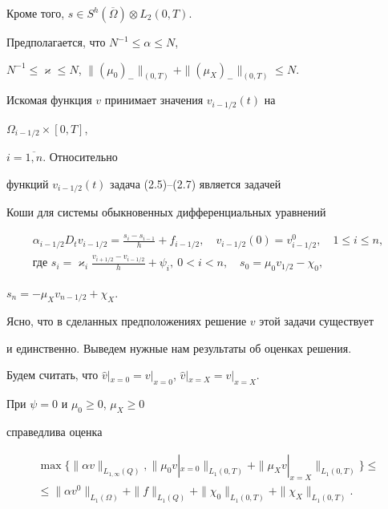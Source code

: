 \documentclass[12pt]{article}
\theoremstyle{plain} %
\newtheorem{lemm}{\hskip\parindent Лемма}[section]
\theoremstyle{definition}
\numberwithin{equation}{section}
\begin{document}
Кроме того, $s\in S^h(\overline\Omega)\otimes L_2(0,T)$.


Предполагается, что $N^{-1}\le \alpha\le N$,


$N^{-1}\le \varkappa\le N$, $\|(\mu_0)_-\|_{(0,T)}+\|(\mu_X)_-\|_{(0,T)}\le N$.





Искомая функция $v$ принимает значения $v_{i-1/2}(t)$ на


$\Omega_{i-1/2}\times [0,T]$,


$i=\overline{1,n}$. Относительно


функций $v_{i-1/2}(t)$ задача (2.5)--(2.7) является задачей


Коши для системы обыкновенных дифференциальных уравнений


\begin{gather*}


\alpha_{i-1/2}D_tv_{i-1/2}=\frac{s_i-s_{i-1}}{h}+f_{i-1/2},


\quad v_{i-1/2}(0)=v^0_{i-1/2},\quad 1\le i\le n,\\


%


\text{где }s_i=\varkappa_i\frac{v_{i+1/2}-v_{i-1/2}}{h}+\psi_i,\


0<i<n,\quad s_0=\mu_0 v_{1/2}-\chi_0,


\end{gather*}


$s_n=-\mu_X v_{n-1/2}+\chi_X$.


Ясно, что в сделанных предположениях решение $v$ этой задачи существует


и единственно. Выведем нужные нам результаты об оценках решения.


Будем считать, что $\widehat v|_{x=0}=v|_{x=0}$, $\widehat v|_{x=X}=v|_{x=X}$.





\begin{lemm} При $\psi=0$ и $\mu_0\ge 0$, $\mu_X\ge 0$


справедлива оценка


\begin{multline*}


\max\bigl\{\|\alpha v\|_{L_{1,\infty}(Q)},\|\mu_0 v|_{x=0}\|_{L_1(0,T)}+


\|\mu_X v|_{x=X}\|_{L_1(0,T)}\bigr\}\le \\


%


\le \|\alpha v^0\|_{L_1(\Omega)}+


\|f\|_{L_1(Q)}+\|\chi_0\|_{L_1(0,T)}+\|\chi_X\|_{L_1(0,T)}.


\end{multline*}


\end{lemm}
\end{document}
